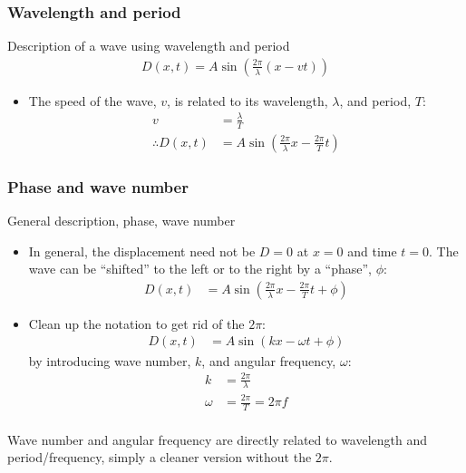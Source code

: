 \documentclass[aspectratio=169,
hyperref={colorlinks,urlcolor=blue}
]{beamer}
\begin{document}
\subsubsection{Wavelength and period}
\label{subsubsec:wavelengthandperiod}
\begin{frame}{Description of a wave using wavelength and period}
\begin{align*}
D(x,t) =A\sin\left (\frac{2\pi}{\lambda}(x-vt)\right)
\end{align*}
\begin{itemize}
\item The speed of the wave, $v$, is related to its wavelength, $\lambda$, and period, $T$:
\begin{align*}
v&=\frac{\lambda}{T}\\
\therefore D(x,t) &=A\sin\left (\frac{2\pi}{\lambda}x-\frac{2\pi}{T}t\right)
\end{align*}
\end{itemize}
\end{frame}


\subsubsection{Phase and wave number}
\label{subsubsec:phaseandwavenumber}
\begin{frame}{General description, phase, wave number}
\begin{itemize}
\item In general, the displacement need not be $D=0$ at $x=0$ and time $t=0$. The wave can be ``shifted'' to the left or to the right by a ``phase'', $\phi$:
\begin{align*}
 D(x,t) &=A\sin\left (\frac{2\pi}{\lambda}x-\frac{2\pi}{T}t +\phi\right)
\end{align*}
\item Clean up the notation to get rid of the $2\pi$:
\begin{align*}
 D(x,t) &=A\sin\left (kx-\omega t +\phi\right)
\end{align*}
by introducing wave number, $k$, and angular frequency, $\omega$:
\begin{align*}
k&=\frac{2\pi}{\lambda}\\
\omega&=\frac{2\pi}{T}=2\pi f\\
\end{align*}
\end{itemize}
\vspace{-0.5cm}
Wave number and angular frequency are directly related to wavelength and period/frequency, simply a cleaner version without the $2\pi$.
\end{frame}
\end{document}
